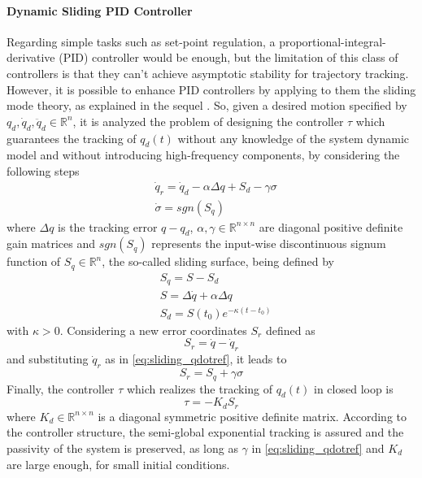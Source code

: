 \paragraph{Dynamic Sliding PID Controller}
Regarding simple tasks such as set-point regulation, a proportional-integral-derivative (PID) controller would be enough, but the limitation of this class of controllers is that they can't achieve asymptotic stability for trajectory tracking. However, it is possible to enhance PID controllers by applying to them the sliding mode theory, as explained in the sequel \cite{parravega03}. So, given a desired motion specified by $q_d,\dot{q}_d,\ddot{q}_d\in\mathbb{R}^n$, it is analyzed the problem of designing the controller $\tau$ which guarantees the tracking of $q_d(t)$ without any knowledge of the system dynamic model and without introducing high-frequency components, by considering the following steps
\begin{align}
&\dot{q}_r = \dot{q}_d - \alpha\Delta{q} + S_d - \gamma\sigma \label{eq:sliding_qdotref}\\
&\dot{\sigma} = sgn(S_q)
\end{align}
where $\Delta{q}$ is the tracking error $q-q_d$, $\alpha,\gamma\in\mathbb{R}^{n \times n}$ are diagonal positive definite gain matrices and $sgn(S_q)$ represents the input-wise discontinuous signum function of $S_q\in\mathbb{R}^n$, the so-called sliding surface, being defined by
\begin{align}
&S_q = S - S_d\\
&S = \Delta{\dot{q}} + \alpha\Delta{q}\\
&S_d = S(t_0)e^{-\kappa(t-t_0)}
\end{align}
with $\kappa > 0$.
Considering a new error coordinates $S_r$ defined as
\begin{equation}
S_r = \dot{q} - \dot{q}_r
\end{equation}
and substituting $\dot{q}_r$ as in \eqref{eq:sliding_qdotref}, it leads to
\begin{equation}
S_r = S_q + \gamma\sigma
\end{equation}
Finally, the controller $\tau$ which realizes the tracking of $q_d(t)$ in closed loop is
\begin{equation}
\tau = -K_{d}S_r
\end{equation}
where $K_d\in\mathbb{R}^{n \times n}$ is a diagonal symmetric positive definite matrix. According to the controller structure, the semi-global exponential tracking is assured and the passivity of the system is preserved, as long as $\gamma$ in \eqref{eq:sliding_qdotref} and $K_d$ are large enough, for small initial conditions.

